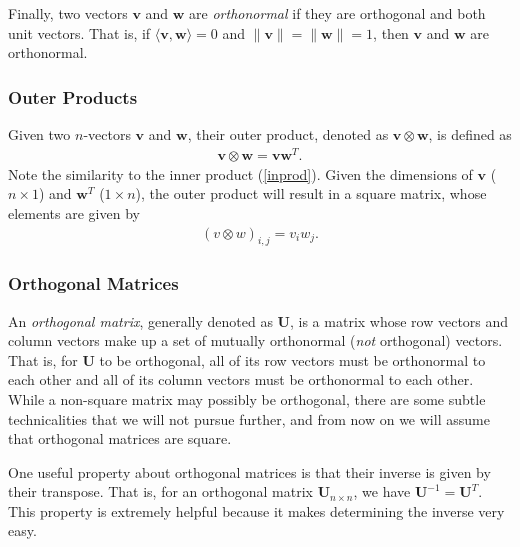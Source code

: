 \documentclass[10pt]{article}
\newcommand{\mydef}[1]{\textcolor{SteelBlue3}{\textit{#1}}} %
\begin{document}

Finally, two vectors $\mathbf{v}$ and $\mathbf{w}$ are \mydef{orthonormal} if they are orthogonal and both unit vectors. That is, if $\langle \mathbf{v},\mathbf{w} \rangle = 0$ and $\| \mathbf{v} \| = \| \mathbf{w} \| = 1$, then $\mathbf{v}$ and $\mathbf{w}$ are orthonormal. 

\subsubsection{Outer Products}

Given two $n$-vectors $\mathbf{v}$ and $\mathbf{w}$, their outer product, denoted as $\mathbf{v} \otimes \mathbf{w}$, is defined as 
\begin{align}
    \label{outerproduct}
    \mathbf{v} \otimes \mathbf{w} = \mathbf{v} \mathbf{w}^T.
\end{align}
Note the similarity to the inner product (\ref{inprod}). Given the dimensions of $\mathbf{v}$ ($n \times 1$) and $\mathbf{w}^T$ ($1 \times n$), the outer product will result in a square matrix, whose elements are given by 
\begin{align}
    (v \otimes w)_{i,j} = v_i w_j.
\end{align}

\subsubsection{Orthogonal Matrices}

An \mydef{orthogonal matrix}, generally denoted as $\mathbf{U}$, is a matrix whose row vectors and column vectors make up a set of mutually orthonormal (\textit{not} orthogonal) vectors. That is, for $\mathbf{U}$ to be orthogonal, all of its row vectors must be orthonormal to each other and all of its column vectors must be orthonormal to each other. While a non-square matrix may possibly be orthogonal, there are some subtle technicalities that we will not pursue further, and from now on we will assume that orthogonal matrices are square.

One useful property about orthogonal matrices is that their inverse is given by their transpose. That is, for an orthogonal matrix $\mathbf{U}_{n \times n}$, we have $\mathbf{U}^{-1} = \mathbf{U}^T$. This property is extremely helpful because it makes determining the inverse very easy.
\end{document}
